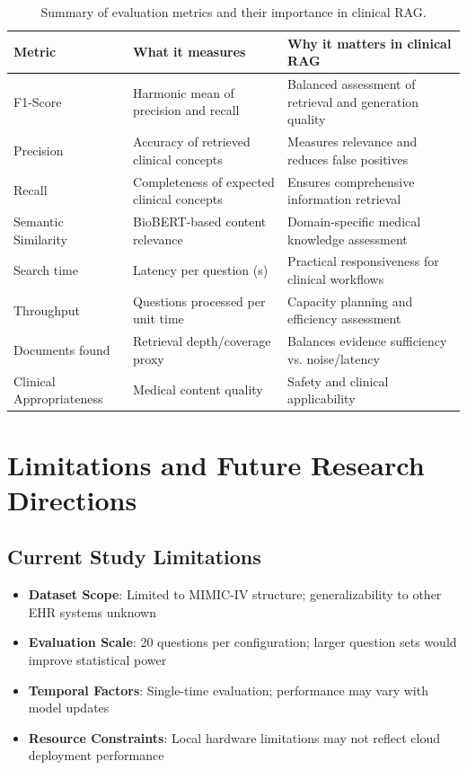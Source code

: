 \begin{table}[h]
\centering
\begin{footnotesize}
\renewcommand\arraystretch{0.95}
\begin{tabularx}{\textwidth}{l X X}
  \toprule
  Metric & What it measures & Why it matters in clinical RAG \\
  \midrule
  F1-Score & Harmonic mean of precision and recall & Balanced assessment of retrieval and generation quality \\[3em]
  Precision & Accuracy of retrieved clinical concepts & Measures relevance and reduces false positives \\[2em]
  Recall & Completeness of expected clinical concepts & Ensures comprehensive information retrieval \\[2em]
  Semantic Similarity & BioBERT-based content relevance & Domain-specific medical knowledge assessment \\[2em]
  Search time & Latency per question (s) & Practical responsiveness for clinical workflows \\[2em]
  Throughput & Questions processed per unit time & Capacity planning and efficiency assessment \\[2em]
  Documents found & Retrieval depth/coverage proxy & Balances evidence sufficiency vs. noise/latency \\[2em]
  Clinical Appropriateness & Medical content quality & Safety and clinical applicability \\[4pt]
  \bottomrule
\end{tabularx}
\end{footnotesize}
\caption{Summary of evaluation metrics and their importance in clinical RAG.}
\label{tab:metrics_summary}
\end{table}

\section{Limitations and Future Research Directions}

\subsection{Current Study Limitations}

\begin{itemize}
    \item \textbf{Dataset Scope}: Limited to MIMIC-IV structure; generalizability to other EHR systems unknown
    \item \textbf{Evaluation Scale}: 20 questions per configuration; larger question sets would improve statistical power
    \item \textbf{Temporal Factors}: Single-time evaluation; performance may vary with model updates
    \item \textbf{Resource Constraints}: Local hardware limitations may not reflect cloud deployment performance
\end{itemize}

